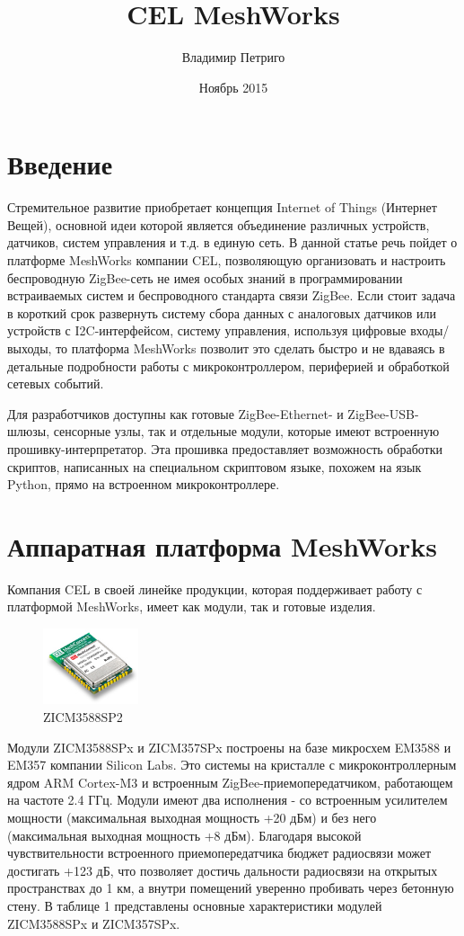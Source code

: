 \documentclass[12pt]{article}
\title{CEL MeshWorks}
\author{Владимир Петриго}
\date{Ноябрь 2015}
\begin{document}
\maketitle

\section{Введение}

Стремительное развитие приобретает концепция Internet of Things (Интернет Вещей),
основной идеи которой является объединение различных устройств, датчиков, систем
управления и т.д. в единую сеть. В данной статье речь пойдет о платформе MeshWorks 
компании CEL, позволяющую организовать и настроить беспроводную ZigBee-сеть не 
имея особых знаний в программировании встраиваемых систем и беспроводного стандарта 
связи ZigBee. Если стоит задача в короткий срок развернуть систему сбора данных 
с аналоговых датчиков или устройств с I2C-интерфейсом, систему управления, 
используя цифровые входы/выходы, то платформа MeshWorks позволит
это сделать быстро и не вдаваясь в детальные подробности работы с микроконтроллером, 
периферией и обработкой сетевых событий.

Для разработчиков доступны как готовые ZigBee-Ethernet- и ZigBee-USB-шлюзы, 
сенсорные узлы, так и отдельные модули, которые имеют встроенную 
прошивку-интерпретатор. Эта прошивка предоставляет возможность обработки скриптов, 
написанных на специальном скриптовом языке, похожем на язык Python, прямо на 
встроенном микроконтроллере. 
\section{Аппаратная платформа MeshWorks}
Компания CEL в своей линейке продукции, которая поддерживает работу с платформой 
MeshWorks, имеет как модули, так и готовые изделия.
\begin{figure}
  \begin{center}
    \includegraphics[width=0.25\textwidth]{mc_em358x_mini.jpg}
  \end{center}
  \caption{ZICM3588SP2}
\end{figure}
Модули ZICM3588SPx и ZICM357SPx построены на базе микросхем EM3588 и EM357 компании
Silicon Labs. Это системы на кристалле с микроконтроллерным ядром ARM Cortex-M3 и
встроенным ZigBee-приемопередатчиком, работающем на частоте 2.4 ГГц. Модули имеют
два исполнения - со встроенным усилителем мощности (максимальная выходная мощность
+20 дБм) и без него (максимальная выходная мощность +8 дБм). Благодаря высокой 
чувствительности встроенного приемопередатчика бюджет радиосвязи может достигать 
+123 дБ, что позволяет достичь дальности радиосвязи на открытых пространствах до 1 км,
а внутри помещений уверенно пробивать через бетонную стену. В таблице 1 представлены
основные характеристики модулей ZICM3588SPx и ZICM357SPx.
\end{document}
